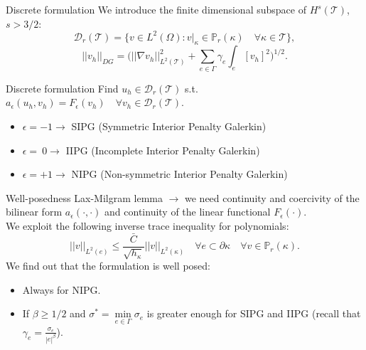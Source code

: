 \documentclass{beamer}
\begin{document}
\begin{frame}{Discrete formulation}
	We introduce the finite dimensional subspace of $H^s(\mathcal{T})$, $s>3/2$:
	\begin{equation*}
	\mathcal{D}_r(\mathcal{T}) = \{ v \in L^2(\Omega) : v|_\kappa \in
	\mathbb{P}_r(\kappa) \quad \forall \kappa \in \mathcal{T}  \},
	\end{equation*}
	\begin{equation*}
		|\!|v_h|\!|_{DG} = \bigg( |\!|\nabla v_h|\!|^2_{L^2(\mathcal{T})} +
		\sum_{e \in \Gamma} \gamma_e \int_e [v_h]^2 \bigg)^{1/2}.
	\end{equation*}
	\begin{block}{Discrete formulation}
	Find $u_h \in \mathcal{D}_r(\mathcal{T})$ s.t. $a_\epsilon(u_h, v_h) =
	F_\epsilon(v_h) \quad \forall v_h \in \mathcal{D}_r(\mathcal{T})$.
	\end{block}
	\begin{itemize}
		\item $\epsilon = -1 \rightarrow$ SIPG (Symmetric Interior Penalty
		Galerkin)
		\item $\epsilon = ~0 \rightarrow$ IIPG (Incomplete Interior Penalty
		Galerkin)
		\item $\epsilon = +1 \rightarrow$ NIPG (Non-symmetric Interior Penalty
		Galerkin)
	\end{itemize}
\end{frame}
\begin{frame}{Well-posedness}
	Lax-Milgram lemma $\rightarrow$ we need continuity and coercivity of the
	bilinear form $a_\epsilon (\cdot, \cdot)$ and continuity of the linear
	functional $F_\epsilon(\cdot)$.\\
	\vspace*{0.5cm}
	We exploit the following inverse trace inequality for polynomials:
	\begin{equation*}
		|\!|v|\!|_{L^2(e)} \leq \frac{\bar{C}}{\sqrt{h_\kappa}} 
		|\!|v|\!|_{L^2(\kappa)} \quad \forall e \subset \partial \kappa \quad 
		\forall 
		v \in \mathbb{P}_r(\kappa).
	\end{equation*}
	We find out that the formulation is well posed:
	\begin{itemize}
		\item Always for NIPG.
		\item If $\beta \geq 1/2$ and $\sigma^* = \min\limits_{e \in \Gamma}
		\sigma_e$ is greater enough for SIPG and IIPG (recall that $\gamma_e =
		\frac{\sigma_e}{|e|^\beta}$).
	\end{itemize}
\end{frame}
\end{document}
